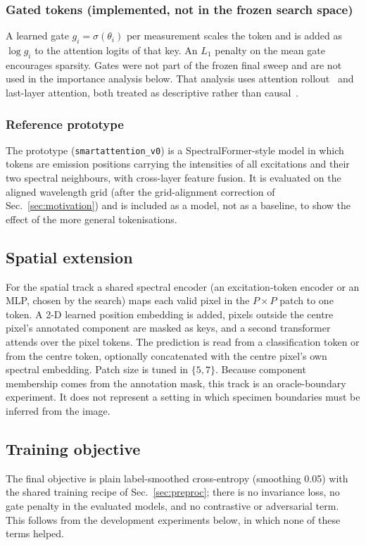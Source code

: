 \documentclass[journal]{IEEEtran}
\begin{document}
\subsubsection{Gated tokens (implemented, not in the frozen search space)}
A learned gate $g_i=\sigma(\theta_i)$ per measurement scales the token and is added as $\log g_i$ to the attention logits of that key. An $L_1$ penalty on the mean gate encourages sparsity. Gates were not part of the frozen final sweep and are not used in the importance analysis below. That analysis uses attention rollout~\cite{abnar2020flow} and last-layer attention, both treated as descriptive rather than causal~\cite{jain2019notexpl}.

\subsubsection{Reference prototype}
The prototype (\texttt{smartattention\_v0}) is a SpectralFormer-style model in which tokens are emission positions carrying the intensities of all excitations and their two spectral neighbours, with cross-layer feature fusion. It is evaluated on the aligned wavelength grid (after the grid-alignment correction of Sec.~\ref{sec:motivation}) and is included as a model, not as a baseline, to show the effect of the more general tokenisations.

\subsection{Spatial extension}
For the spatial track a shared spectral encoder (an excitation-token encoder or an MLP, chosen by the search) maps each valid pixel in the $P\times P$ patch to one token. A 2-D learned position embedding is added, pixels outside the centre pixel's annotated component are masked as keys, and a second transformer attends over the pixel tokens. The prediction is read from a classification token or from the centre token, optionally concatenated with the centre pixel's own spectral embedding. Patch size is tuned in $\{5,7\}$. Because component membership comes from the annotation mask, this track is an oracle-boundary experiment. It does not represent a setting in which specimen boundaries must be inferred from the image.

\subsection{Training objective}
The final objective is plain label-smoothed cross-entropy (smoothing 0.05) with the shared training recipe of Sec.~\ref{sec:preproc}; there is no invariance loss, no gate penalty in the evaluated models, and no contrastive or adversarial term. This follows from the development experiments below, in which none of these terms helped.
\end{document}
